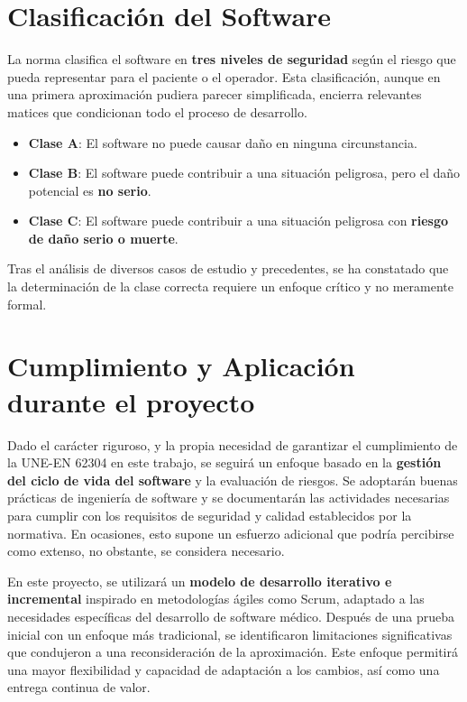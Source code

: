 \newpage
\section{Clasificación del Software}
La norma clasifica el software en \textbf{tres niveles de seguridad} según el riesgo que pueda representar para el paciente o el operador. Esta clasificación, aunque en una primera aproximación pudiera parecer simplificada, encierra relevantes matices que condicionan todo el proceso de desarrollo.

\begin{itemize}
    \item \textbf{Clase A}: El software no puede causar daño en ninguna circunstancia.
    \item \textbf{Clase B}: El software puede contribuir a una situación peligrosa, pero el daño potencial es \textbf{no serio}.
    \item \textbf{Clase C}: El software puede contribuir a una situación peligrosa con \textbf{riesgo de daño serio o muerte}.
\end{itemize}

Tras el análisis de diversos casos de estudio y precedentes, se ha constatado que la determinación de la clase correcta requiere un enfoque crítico y no meramente formal.

\section{Cumplimiento y Aplicación durante el proyecto}
Dado el carácter riguroso, y la propia necesidad de garantizar el cumplimiento de la UNE-EN 62304 \cite{UNE-EN-62304} en este trabajo, se seguirá un enfoque basado en la \textbf{gestión del ciclo de vida del software} y la evaluación de riesgos. Se adoptarán buenas prácticas de ingeniería de software y se documentarán las actividades necesarias para cumplir con los requisitos de seguridad y calidad establecidos por la normativa. En ocasiones, esto supone un esfuerzo adicional que podría percibirse como extenso, no obstante, se considera necesario.

En este proyecto, se utilizará un \textbf{modelo de desarrollo iterativo e incremental} inspirado en metodologías ágiles como Scrum, adaptado a las necesidades específicas del desarrollo de software médico. Después de una prueba inicial con un enfoque más tradicional, se identificaron limitaciones significativas que condujeron a una reconsideración de la aproximación. Este enfoque permitirá una mayor flexibilidad y capacidad de adaptación a los cambios, así como una entrega continua de valor.

